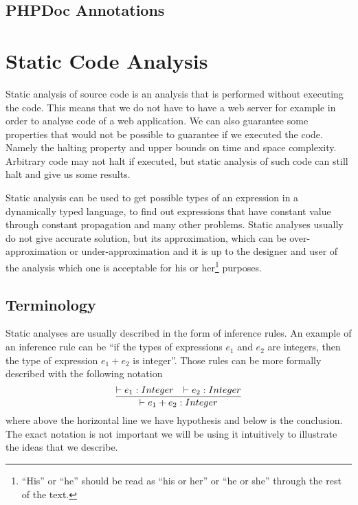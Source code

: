     \subsection{PHPDoc Annotations}
    
    \section{Static Code Analysis}       
        Static analysis of source code is an analysis that is performed without 
        executing the code. This means that we do not have to have a
        web server for example in order to analyse code of a web application. 
        We can also guarantee some properties that would not be possible to 
        guarantee if we executed the code. Namely the halting property and 
        upper bounds on time and space complexity. Arbitrary code may not 
        halt if executed, but static analysis of such code can still halt 
        and give us some results.
        
        Static analysis can be used to get possible types of an expression in 
        a dynamically typed language, to find out expressions that have constant 
        value through constant propagation and many other problems. 
        Static analyses usually do not give accurate solution, but 
        its approximation, which can be over-approximation or 
        under-approximation and it is up to the designer and user of the analysis 
        which one is acceptable for his or her\footnote{``His'' or ``he'' 
        should be read as ``his or her'' or ``he or she'' through the rest of the text.} 
        purposes.                
        
        \subsection{Terminology}
        
        Static analyses are usually described in the form of inference rules. 
        An example of an inference rule can be 
        ``if the types of expressions $e_1$ and $e_2$ are integers, then the type of 
        expression $e_1+e_2$ is integer''. Those rules can be more formally 
        described with the following notation        
        $$
        \infer{\vdash e_1+e_2 : Integer}{\vdash e_1 : Integer & \vdash e_2 : Integer}
        $$        
        where above the horizontal line we have hypothesis and below is 
        the conclusion. The exact notation is not important we will be using it 
        intuitively to illustrate the ideas that we describe.
        
